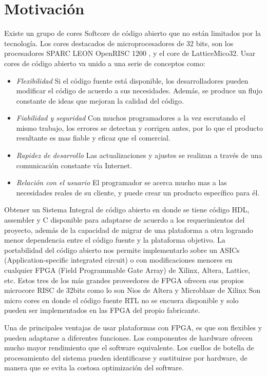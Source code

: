 \section{Motivación} 

Existe un grupo de cores Softcore de código abierto que no están limitados por la tecnología. Los cores destacados de microprocesadores de 32 bits,
son los procesadores SPARC LEON OpenRISC 1200 , y el core de LatticeMico32. Usar cores de código abierto va unido a una serie de conceptos como:
\begin {itemize}
\item
\textit{Flexibilidad}  Si el código fuente está disponible, los desarrolladores pueden modificar el código de acuerdo a sus necesidades. Además, se
produce un flujo constante de ideas que mejoran la calidad del código.
\item 
\textit{Fiabilidad y seguridad}  Con muchos programadores a la vez escrutando el mismo trabajo, los errores se detectan y corrigen antes, por lo que
el producto resultante es mas fiable y eficaz que el comercial.
\item 
\textit{Rapidez de desarrollo}  Las actualizaciones y ajustes se realizan a través de una comunicación constante vía Internet.
\item 
\textit{Relación con el usuario} El programador se acerca mucho mas a las necesidades reales de su cliente, y puede crear un producto específico para
él.
 \end {itemize}
 
Obtener un Sistema Integral de código abierto en donde se tiene código HDL, assembler y C disponible para adaptarse de acuerdo a los requerimientos
del proyecto, además de la capacidad de migrar de una plataforma a otra logrando menor dependencia entre el código fuente y la plataforma
objetivo. La portabilidad del código abierto nos permite implementarlo sobre un ASICs (Application-specific integrated circuit) o con modificaciones
menores en cualquier FPGA (Field Programmable Gate Array) de Xilinx, Altera, Lattice, etc. Estos tres de los más grandes proveedores de FPGA  %
ofrecen sus propios microcore RISC de 32bits como lo son Nios de  Altera y Microblaze de Xilinx  Son micro cores en donde el código fuente RTL no se
encuera disponible y solo pueden ser implementados en las FPGA del propio fabricante.

Una de principales ventajas de usar plataformas con FPGA, es que son flexibles y pueden adaptarse a diferentes funciones. Los componentes de
hardware ofrecen mucho mayor rendimiento que el software equivalente. Los cuellos de botella de procesamiento del sistema pueden identificarse y
sustituirse por hardware, de manera que se evita la costosa optimización del software.

